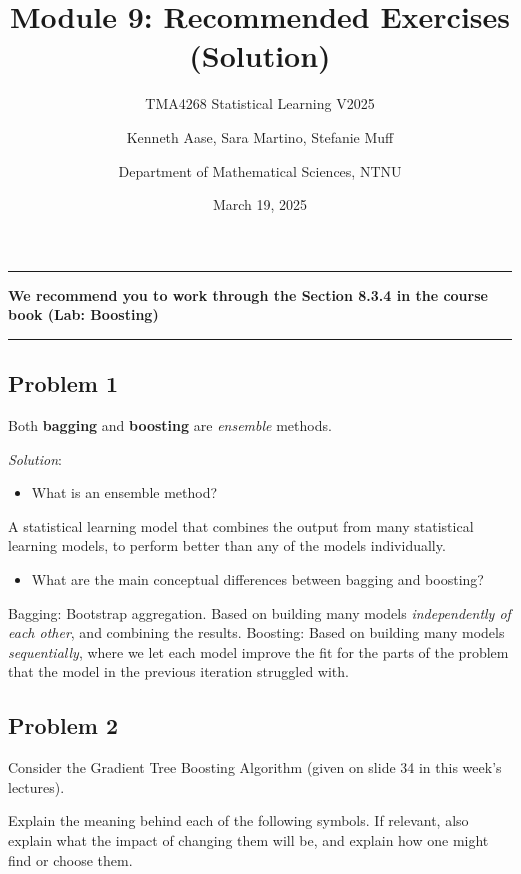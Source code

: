 \documentclass[
]{article}
\title{Module 9: Recommended Exercises (Solution)}
\subtitle{TMA4268 Statistical Learning V2025}
\author{Kenneth Aase, Sara Martino, Stefanie Muff \and Department of
Mathematical Sciences, NTNU}
\date{March 19, 2025}
\providecommand{\tightlist}{%
  \setlength{\itemsep}{0pt}\setlength{\parskip}{0pt}}
\begin{document}
\maketitle

\begin{center}\rule{0.5\linewidth}{0.5pt}\end{center}

\textbf{We recommend you to work through the Section 8.3.4 in the course
book (Lab: Boosting)}

\begin{center}\rule{0.5\linewidth}{0.5pt}\end{center}

\subsection{Problem 1}\label{problem-1}

Both \textbf{bagging} and \textbf{boosting} are \emph{ensemble} methods.

\emph{Solution}:

\begin{itemize}
\tightlist
\item
  What is an ensemble method?
\end{itemize}

A statistical learning model that combines the output from many
statistical learning models, to perform better than any of the models
individually.

\begin{itemize}
\tightlist
\item
  What are the main conceptual differences between bagging and boosting?
\end{itemize}

Bagging: Bootstrap aggregation. Based on building many models
\emph{independently of each other}, and combining the results. Boosting:
Based on building many models \emph{sequentially}, where we let each
model improve the fit for the parts of the problem that the model in the
previous iteration struggled with.

\subsection{Problem 2}\label{problem-2}

Consider the Gradient Tree Boosting Algorithm (given on slide 34 in this
week's lectures).

Explain the meaning behind each of the following symbols. If relevant,
also explain what the impact of changing them will be, and explain how
one might find or choose them.
\end{document}
